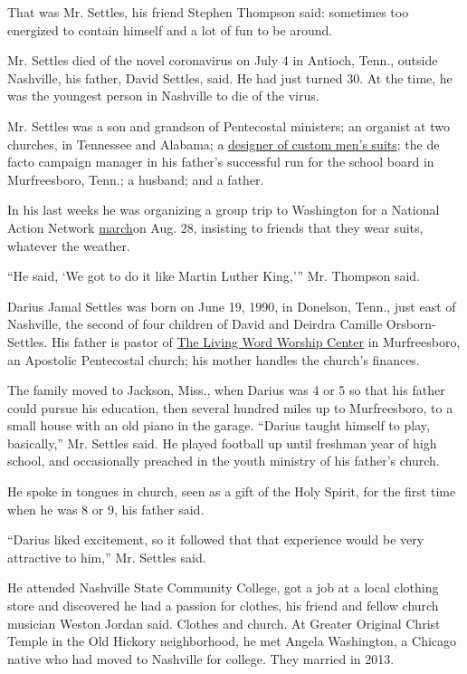 That was Mr. Settles, his friend Stephen Thompson said: sometimes too
energized to contain himself and a lot of fun to be around.

Mr. Settles died of the novel coronavirus on July 4 in Antioch, Tenn.,
outside Nashville, his father, David Settles, said. He had just turned
30. At the time, he was the youngest person in Nashville to die of the
virus.

Mr. Settles was a son and grandson of Pentecostal ministers; an organist
at two churches, in Tennessee and Alabama; a
\href{https://www.linkedin.com/in/darius-settles-022196ba/}{designer of
custom men's suits}; the de facto campaign manager in his father's
successful run for the school board in Murfreesboro, Tenn.; a husband;
and a father.

In his last weeks he was organizing a group trip to Washington for a
National Action Network
\href{https://www.washingtonpost.com/local/as-dc-protests-continue-preparations-begin-for-100000-person-march-on-washington-in-august/2020/06/10/bcafc584-ab2f-11ea-a9d9-a81c1a491c52_story.html}{march}on
Aug. 28, insisting to friends that they wear suits, whatever the
weather.

``He said, `We got to do it like Martin Luther King,''' Mr. Thompson
said.

Darius Jamal Settles was born on June 19, 1990, in Donelson, Tenn., just
east of Nashville, the second of four children of David and Deirdra
Camille Orsborn-Settles. His father is pastor of
\href{https://tlwwc.wordpress.com/about/}{The Living Word Worship
Center} in Murfreesboro, an Apostolic Pentecostal church; his mother
handles the church's finances.

The family moved to Jackson, Miss., when Darius was 4 or 5 so that his
father could pursue his education, then several hundred miles up to
Murfreesboro, to a small house with an old piano in the garage. ``Darius
taught himself to play, basically,'' Mr. Settles said. He played
football up until freshman year of high school, and occasionally
preached in the youth ministry of his father's church.

He spoke in tongues in church, seen as a gift of the Holy Spirit, for
the first time when he was 8 or 9, his father said.

``Darius liked excitement, so it followed that that experience would be
very attractive to him,'' Mr. Settles said.

He attended Nashville State Community College, got a job at a local
clothing store and discovered he had a passion for clothes, his friend
and fellow church musician Weston Jordan said. Clothes and church. At
Greater Original Christ Temple in the Old Hickory neighborhood, he met
Angela Washington, a Chicago native who had moved to Nashville for
college. They married in 2013.

